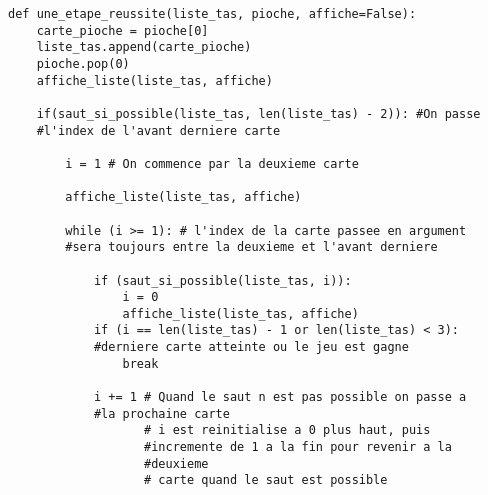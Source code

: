 	\lstset{language=Python}
	\lstset{frame=lines}
	\lstset{basicstyle=\footnotesize}
	\begin{lstlisting}	
def une_etape_reussite(liste_tas, pioche, affiche=False):
    carte_pioche = pioche[0]
    liste_tas.append(carte_pioche)
    pioche.pop(0)
    affiche_liste(liste_tas, affiche)

    if(saut_si_possible(liste_tas, len(liste_tas) - 2)): #On passe 
    #l'index de l'avant derniere carte

        i = 1 # On commence par la deuxieme carte

        affiche_liste(liste_tas, affiche) 

        while (i >= 1): # l'index de la carte passee en argument 
        #sera toujours entre la deuxieme et l'avant derniere

            if (saut_si_possible(liste_tas, i)):
                i = 0 
                affiche_liste(liste_tas, affiche)
            if (i == len(liste_tas) - 1 or len(liste_tas) < 3): 
            #derniere carte atteinte ou le jeu est gagne
                break

            i += 1 # Quand le saut n est pas possible on passe a 
            #la prochaine carte
                   # i est reinitialise a 0 plus haut, puis 
                   #incremente de 1 a la fin pour revenir a la 
                   #deuxieme
                   # carte quand le saut est possible
	\end{lstlisting}